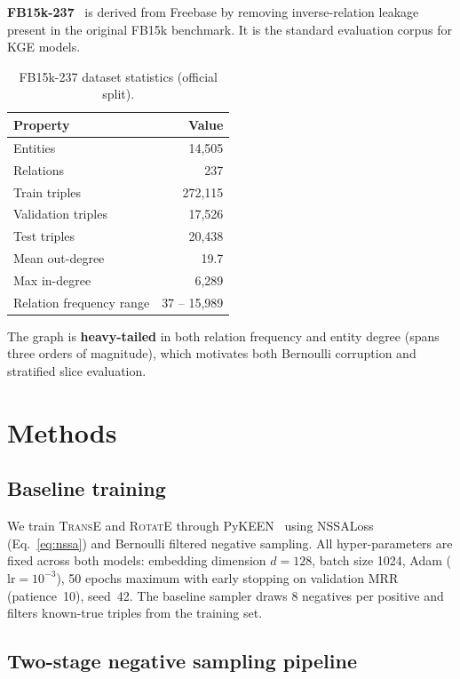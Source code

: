 \documentclass[10pt,twocolumn,letterpaper]{article}
\begin{document}
\textbf{FB15k-237}~\cite{toutanova2015observed} is derived from Freebase by removing
inverse-relation leakage present in the original FB15k benchmark.
It is the standard evaluation corpus for KGE models.

\begin{table}[h]
\centering\small
\caption{FB15k-237 dataset statistics (official split).}
\label{tab:dataset}
\begin{tabular}{@{}lr@{}}
\toprule
Property & Value \\
\midrule
Entities & 14,505 \\
Relations & 237 \\
Train triples & 272,115 \\
Validation triples & 17,526 \\
Test triples & 20,438 \\
Mean out-degree & 19.7 \\
Max in-degree & 6,289 \\
Relation frequency range & 37 -- 15,989 \\
\bottomrule
\end{tabular}
\end{table}

The graph is \textbf{heavy-tailed} in both relation frequency and entity
degree (spans three orders of magnitude), which motivates both Bernoulli
corruption and stratified slice evaluation.

\section{Methods}
\label{sec:methods}

\subsection{Baseline training}

We train \textsc{TransE} and \textsc{RotatE} through PyKEEN~\cite{ali2021pykeen}
using NSSALoss (Eq.~\ref{eq:nssa}) and Bernoulli filtered negative sampling.
All hyper-parameters are fixed across both models:
embedding dimension $d=128$, batch size 1024, Adam ($\mathrm{lr}=10^{-3}$),
50 epochs maximum with early stopping on validation MRR (patience~10),
seed~42.
The baseline sampler draws 8 negatives per positive and filters known-true
triples from the training set.

\subsection{Two-stage negative sampling pipeline}
\end{document}
